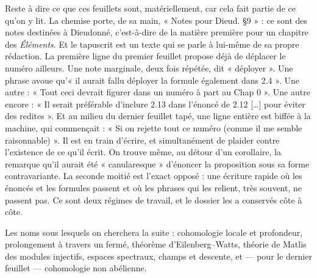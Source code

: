 \documentclass[11pt,a4paper]{article}
\begin{document}
\begin{resume}
Reste à dire ce que ces feuillets sont, matériellement, car cela fait partie de
ce qu'on y lit. La chemise porte, de sa main, « Notes pour Dieud. §9 » : ce
sont des notes destinées à Dieudonné, c'est-à-dire de la matière première pour
un chapitre des \emph{Éléments}. Et le tapuscrit est un texte qui se parle à
lui-même de sa propre rédaction. La première ligne du premier feuillet propose
déjà de déplacer le numéro ailleurs. Une note marginale, deux fois répétée, dit
« déployer ». Une phrase avoue qu'« il aurait fallu déployer la formule
également dans 2.4 ». Une autre : « Tout ceci devrait figurer dans un numéro à
part au Chap 0 ». Une autre encore : « Il serait préférable d'inclure 2.13 dans
l'énoncé de 2.12 […] pour éviter des redites ». Et au milieu du dernier
feuillet tapé, une ligne entière est biffée à la machine, qui commençait :
« Si on rejette tout ce numéro (comme il me semble raisonnable) ». Il est en
train d'écrire, et simultanément de plaider contre l'existence de ce qu'il
écrit. On trouve même, au détour d'un corollaire, la remarque qu'il aurait été
« canularesque » d'énoncer la proposition sous sa forme contravariante. La
seconde moitié est l'exact opposé : une écriture rapide où les énoncés et les
formules passent et où les phrases qui les relient, très souvent, ne passent
pas. Ce sont deux régimes de travail, et le dossier les a conservés côte à
côte.

Les noms sous lesquels on cherchera la suite : cohomologie locale et
profondeur, prolongement à travers un fermé, théorème d'Eilenberg--Watts,
théorie de Matlis des modules injectifs, espaces spectraux, champs et descente,
et — pour le dernier feuillet — cohomologie non abélienne.

\end{resume}

\end{document}
